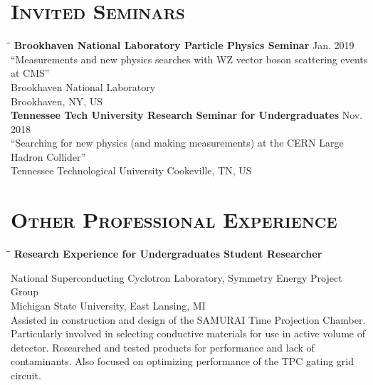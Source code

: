 \documentclass[10pt]{res} %
\begin{document}
\begin{resume}
\section{\textsc{Invited Seminars}}
\vspace{-0.1in}
\begin{tabbing}
\hspace{2.3in}\= \hspace{2.6in}\= \kill %
\textbf{Brookhaven National Laboratory Particle Physics Seminar} \>\> Jan. 2019\\ 
``Measurements and new physics searches with WZ vector boson scattering events at CMS'' \\
Brookhaven National Laboratory \\
Brookhaven, NY, US \\
\textbf{Tennessee Tech University Research Seminar for Undergraduates} \>\> Nov. 2018\\ 
``Searching for new physics (and making measurements) at the CERN Large Hadron Collider'' \\
Tennessee Technological University
Cookeville, TN, US \\
\end{tabbing}\vspace{-20pt}      %


\section{\textsc{Other Professional Experience}}
\vspace{-0.1in}
\begin{tabbing}
\hspace{2.3in}\= \hspace{2.5in}\= \kill %
  \textbf{Research Experience for Undergraduates Student Researcher} \>
\end{tabbing}\vspace{-20pt}      %
National Superconducting Cyclotron Laboratory, Symmetry Energy Project Group \\
Michigan State University, East Lansing, MI \\
Assisted in construction and design of the SAMURAI Time Projection Chamber. 
Particularly involved in selecting conductive materials for use in active 
volume of detector. Researched and tested products for performance and lack 
of contaminants. Also focused on optimizing performance of the TPC gating grid circuit.


\end{resume}
\end{document}
